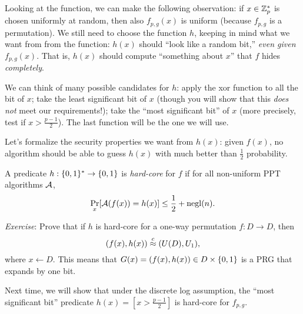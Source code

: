 \documentclass[11pt]{article}
\begin{document}
Looking at the function, we can make the following observation: if $x
\in \mathbb{Z}_p^{*}$ is chosen uniformly at random, then also $f_{p,g}(x)$ is
uniform (because $f_{p,g}$ is a permutation).  We still need to choose
the function $h$, keeping in mind what we want from from the function:
$h(x)$ should ``look like a random bit,'' \emph{even given
  $f_{p,g}(x)$}.  That is, $h(x)$ should compute ``something about
$x$'' that $f$ hides \emph{completely}.

We can think of many possible candidates for $h$: apply the xor
function to all the bit of $x$; take the least significant bit of $x$
(though you will show that this \emph{does not} meet our
requirements!); take the ``most significant bit'' of $x$ (more
precisely, test if $x>\frac{p-1}{2}$).  The last function will be the
one we will use.

Let's formalize the security properties we want from $h(x)$: given
$f(x)$, no algorithm should be able to guess $h(x)$ with much better
than $\frac{1}{2}$ probability.

\begin{definition}
  \label{def:hard-core-pred}
  A predicate $h: \{0,1\}^* \to \{0,1\}$ is \emph{hard-core} for $f$ if for
  all non-uniform PPT algorithms $\mathcal{A}$,
  \[ \Pr_{x}[\mathcal{A}(f(x))=h(x)] \leq \frac{1}{2} + \operatorname{negl}(n). \]
\end{definition}

\emph{Exercise}: Prove that if $h$ is hard-core for a one-way
permutation $f:D \to D$, then \[ (f(x),h(x)) \stackrel{c}{\approx} (U(D),U_1), \]
where $x \gets D$.  This means that $G(x)=(f(x),h(x)) \in D \times
\{0,1\}$ is a PRG that expands by one bit.

Next time, we will show that under the discrete log assumption, the
``most significant bit'' predicate $h(x) = [x > \frac{p-1}{2}]$ is
hard-core for $f_{p,g}$.
\end{document}
